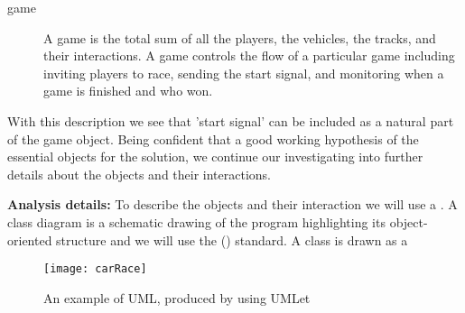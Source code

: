 \documentclass[fsharpnotes.tex]{subfiles}
\begin{document}
\begin{description}
\item[game] A game is the total sum of all the players, the vehicles, the tracks, and their interactions. A game controls the flow of a particular game including inviting players to race, sending the start signal, and monitoring when a game is finished and who won.
\end{description}
With this description we see that 'start signal' can be included as a natural part of the game object. Being confident that a good working hypothesis of the essential objects for the solution, we continue our investigating into further details about the objects and their interactions.

\textbf{Analysis details:} To describe the objects and their interaction we will use a . A class diagram is a schematic drawing of the program highlighting its object-oriented structure and we will use the  () \cite{uml2} standard. A class is drawn as a 

\begin{figure}
  \centering
  \texttt{[image: carRace]}
  \caption{An example of UML, produced by using UMLet \cite{umlet}}
  \label{uml}
\end{figure}
\end{document}
